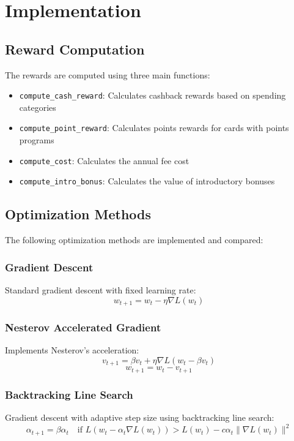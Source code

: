 \documentclass{article}
\begin{document}
\section{Implementation}
\subsection{Reward Computation}
The rewards are computed using three main functions:
\begin{itemize}
    \item \texttt{compute\_cash\_reward}: Calculates cashback rewards based on spending categories
    \item \texttt{compute\_point\_reward}: Calculates points rewards for cards with points programs
    \item \texttt{compute\_cost}: Calculates the annual fee cost
    \item \texttt{compute\_intro\_bonus}: Calculates the value of introductory bonuses
\end{itemize}

\subsection{Optimization Methods}
The following optimization methods are implemented and compared:

\subsubsection{Gradient Descent}
Standard gradient descent with fixed learning rate:
\begin{equation}
    w_{t+1} = w_t - \eta \nabla L(w_t)
\end{equation}

\subsubsection{Nesterov Accelerated Gradient}
Implements Nesterov's acceleration:
\begin{equation}
    v_{t+1} = \beta v_t + \eta \nabla L(w_t - \beta v_t)
\end{equation}
\begin{equation}
    w_{t+1} = w_t - v_{t+1}
\end{equation}

\subsubsection{Backtracking Line Search}
Gradient descent with adaptive step size using backtracking line search:
\begin{equation}
    \alpha_{t+1} = \beta \alpha_t \quad \text{if } L(w_t - \alpha_t \nabla L(w_t)) > L(w_t) - c\alpha_t\|\nabla L(w_t)\|^2
\end{equation}
\end{document}
